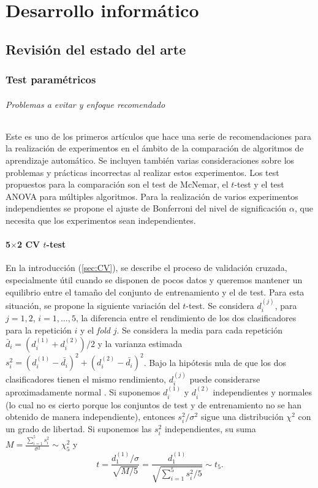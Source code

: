 \part{Desarrollo informático}
\label{part:informatica}

\chapter{Revisión del estado del arte}
\label{chapter:revision}

\section{Test paramétricos}

\paragraph{Problemas a evitar y enfoque recomendado} 
\cite{Salzberg1997} Este es uno de los primeros artículos 
que hace una serie de recomendaciones para la realización
de experimentos en el ámbito de la comparación 
de algoritmos de aprendizaje automático. Se incluyen 
también varias consideraciones sobre los problemas y
prácticas incorrectas al realizar estos experimentos. Los
test propuestos para la comparación son el test de McNemar, 
el $t$-test y el test ANOVA para múltiples algoritmos. Para
la realización de varios experimentos independientes 
se propone el ajuste de Bonferroni del nivel de significación
$\alpha$, que necesita que los experimentos sean
independientes.


\subsection*{5$\times$2 CV $t$-test}
	
	En la introducción (\ref{sec:CV}), se describe el 
proceso de validación cruzada, especialmente útil cuando se
disponen de pocos datos y queremos mantener un equilibrio
entre el tamaño del conjunto de entrenamiento y el de test.
Para esta situación, se propone la siguiente variación 
del $t$-test. Se considera $d_i^{(j)}$, para $j=1,2$, $i=
1,\dots,5$, la diferencia entre el rendimiento de los dos
clasificadores para la repetición $i$ y el \textit{fold} $j$.
Se considera la media para cada repetición $\bar{d}_i = 
(d_i^{(1)} + d_i^{(2)})/2$ y la varianza estimada
$s_i^2 = (d_i^{(1)}-\bar{d_i})^2 + (d_i^{(2)}-\bar{d_i})^2$. 
Bajo la hipótesis nula de que los dos clasificadores tienen 
el mismo rendimiento, $d_i^{(j)}$ puede considerarse 
aproximadamente normal . Si suponemos $d_i^{(1)}$ y 
$d_i^{(2)}$ independientes y normales (lo cual no es
cierto porque los conjuntos de test y de entrenamiento
no se han obtenido de manera independiente), entonces
$s_i^2/\sigma^2$ sigue una distribución $\chi^2$ con un
grado de libertad. Si suponemos las $s_i^2$ independientes,
su suma $M = \frac{\sum\limits_{i=1}^5 s_i^2}{\sigma^2}
\sim \chi^2_5$ y 
\begin{equation}
	\label{eq:5x2CVt}
	t = \frac{d_1^{(1)}/\sigma}{\sqrt{M/5}} = 
		\frac{d_1^{(1)}}
			{\sqrt{\sum\limits_{i=1}^5 s_i^2/5}}
		\sim t_5.
\end{equation}


